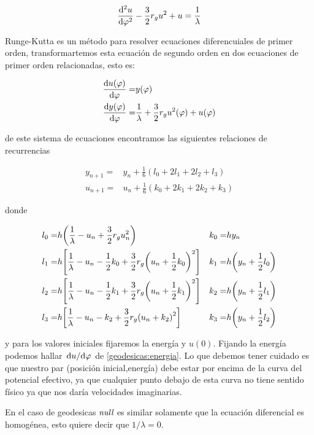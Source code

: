 \documentclass[../Main.tex]{subfiles}
\begin{document}
\begin{equation}
    \dv[2]{u}{\varphi}-\frac{3}{2}r_{g}u^{2}+u = \frac{1}{\lambda}
\end{equation}

Runge-Kutta es un método para resolver ecuaciones diferencuiales de primer orden, transformartemos esta ecuación de segundo orden en dos ecuaciones de primer orden relacionadas, esto es:

\begin{align*}
    \dv{u(\varphi)}{\varphi} = & y(\varphi) \\
    \dv{y(\varphi)}{\varphi} = & \frac{1}{\lambda}+\frac{3}{2}r_{g}u^{2}(\varphi)+u(\varphi)
\end{align*}

de este sistema de ecuaciones encontramos las siguientes relaciones de recurrencias

\begin{align}
    y_{n+1} = & y_{n} + \frac{1}{6}(l_{0}+2l_{1}+2l_{2}+l_{3}) \\
    u_{n+1} = & u_{n} + \frac{1}{6}(k_{0}+2k_{1}+2k_{2}+k_{3})
\end{align}

donde

\begin{align}
    l_{0} = & h\qty(\frac{1}{\lambda}-u_{n}+\frac{3}{2}r_{g}u_{n}^{2}) & k_{0} = & hy_{n} \\
    l_{1} = & h\qty[\frac{1}{\lambda}-u_{n}-\dfrac{1}{2}k_{0}+\frac{3}{2}r_{g}\qty(u_{n}+\dfrac{1}{2}k_{0})^{2}] & k_{1} = & h\qty(y_{n}+\frac{1}{2}l_{0}) \\
    l_{2} = & h\qty[\frac{1}{\lambda}-u_{n}-\dfrac{1}{2}k_{1}+\frac{3}{2}r_{g}\qty(u_{n}+\dfrac{1}{2}k_{1})^{2}] & k_{2} = & h\qty(y_{n}+\frac{1}{2}l_{1}) \\
    l_{3} = & h\qty[\frac{1}{\lambda}-u_{n}-k_{2}+\frac{3}{2}r_{g}\qty(u_{n}+k_{2})^{2}] & k_{3} = & h\qty(y_{n}+\frac{1}{2}l_{2})
\end{align}

y para los valores iniciales fijaremos la energía y $u(0)$. Fijando la energía podemos hallar $\dv*{u}{\varphi}$ de \eqref{geodesicas:energia}. Lo que debemos tener cuidado es que nuestro par (posición inicial,energía) debe estar por encima de la curva del potencial efectivo, ya que cualquier punto debajo de esta curva no tiene sentido físico ya que nos daría velocidades imaginarias. 

En el caso de geodesicas $\textit{null}$ es similar solamente que la ecuación diferencial es homogénea, esto quiere decir que $1/\lambda = 0$.

\biblio %
\end{document}
